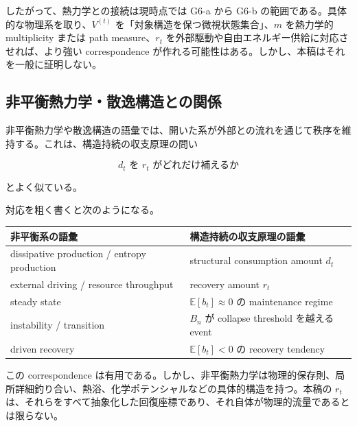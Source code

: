 \documentclass[12pt,a4paper]{article}
\begin{document}
したがって、熱力学との接続は現時点では G6-a から G6-b の範囲である。具体的な物理系を取り、\(V^{(t)}\) を「対象構造を保つ微視状態集合」、\(m\) を熱力学的 multiplicity または path measure、\(r_{t}\) を外部駆動や自由エネルギー供給に対応させれば、より強い correspondence が作れる可能性はある。しかし、本稿はそれを一般に証明しない。

\subsection{非平衡熱力学・散逸構造との関係}\label{ux975eux5e73ux8861ux71b1ux529bux5b66ux6563ux9038ux69cbux9020ux3068ux306eux95a2ux4fc2}

非平衡熱力学や散逸構造の語彙では、開いた系が外部との流れを通じて秩序を維持する。これは、構造持続の収支原理の問い

\[
d_{t} \text{ を } r_{t} \text{ がどれだけ補えるか}
\]

とよく似ている。

対応を粗く書くと次のようになる。

{\def\LTcaptype{table} %
\begin{longtable}[]{@{}
  >{\raggedright\arraybackslash}p{}
  >{\raggedright\arraybackslash}p{}@{}}
\toprule\noalign{}
\begin{minipage}[b]{\linewidth}\raggedright
非平衡系の語彙
\end{minipage} & \begin{minipage}[b]{\linewidth}\raggedright
構造持続の収支原理の語彙
\end{minipage} \\
\midrule\noalign{}
\endhead
\bottomrule\noalign{}
\endlastfoot
dissipative production / entropy production & structural consumption amount \(d_t\) \\
external driving / resource throughput & recovery amount \(r_t\) \\
steady state & \(\mathbb E[b_t]\approx 0\) の maintenance regime \\
instability / transition & \(B_n\) が collapse threshold を越える event \\
driven recovery & \(\mathbb E[b_t]<0\) の recovery tendency \\
\end{longtable}
}

この correspondence は有用である。しかし、非平衡熱力学は物理的保存則、局所詳細釣り合い、熱浴、化学ポテンシャルなどの具体的構造を持つ。本稿の \(r_{t}\) は、それらをすべて抽象化した回復座標であり、それ自体が物理的流量であるとは限らない。
\end{document}
